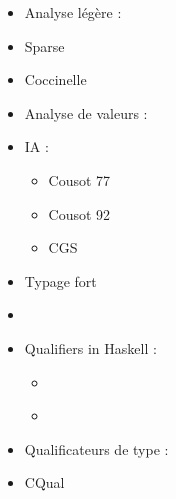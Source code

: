 \begin{itemize}
\item
  Analyse légère :
\item
  Sparse \cite{TorvaldsSparse}
\item
  Coccinelle \cite{coccinelle09}
  \cite{coccinelle11} 
\item
  Analyse de valeurs :
\item
  IA :
  \begin{itemize}
  \item
    Cousot 77 \cite{Cousot77}
  \item
    Cousot 92 \cite{Cousot92-1}
  \item
    CGS \cite{cgs}
  \end{itemize}
\item
  Typage fort
\item
  \cite{TAPL}
\item
  Qualifiers in Haskell :
  \begin{itemize}
  \item
    \cite{lightweight-static-capabilities}
  \item
    \cite{LZ06a}
  \end{itemize}
\item
  Qualificateurs de type :
\item
  CQual \cite{pldi99,usenix01,pldi02,cquk-usenix04,toplas-quals}
\end{itemize}
